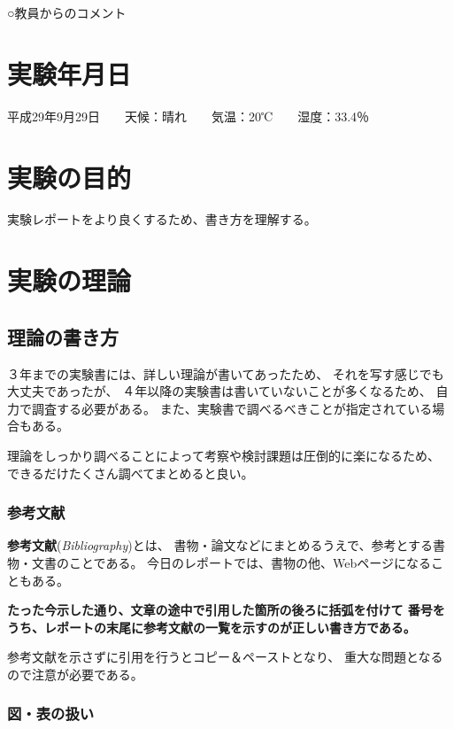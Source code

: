 \documentclass[autodetect-engine,dvipdfmx-if-dvi,ja=standard]{bxjsarticle}
\begin{document}
\newpage

\thispagestyle{empty}
○教員からのコメント


\newpage
\setcounter{table}{0}



\section{実験年月日}
平成29年9月29日　　天候：晴れ　　気温：20℃　　湿度：33.4％


\section{実験の目的}
実験レポートをより良くするため、書き方を理解する。



\section{実験の理論}
\subsection{理論の書き方}
３年までの実験書には、詳しい理論が書いてあったため、
それを写す感じでも大丈夫であったが、
４年以降の実験書は書いていないことが多くなるため、
自力で調査する必要がある。
また、実験書で調べるべきことが指定されている場合もある。

理論をしっかり調べることによって考察や検討課題は圧倒的に楽になるため、
できるだけたくさん調べてまとめると良い。


\subsubsection{参考文献}
\textbf{参考文献}(\textit{Bibliography})とは、
書物・論文などにまとめるうえで、参考とする書物・文書のことである。
\cite{辞書}
今日のレポートでは、書物の他、Webページになることもある。

\textbf{たった今示した通り、文章の途中で引用した箇所の後ろに括弧を付けて
番号をうち、レポートの末尾に参考文献の一覧を示すのが正しい書き方である。}

参考文献を示さずに引用を行うとコピー＆ペーストとなり、
重大な問題となるので注意が必要である。


\subsubsection{図・表の扱い}
\end{document}
